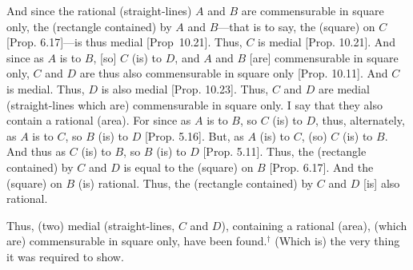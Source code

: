 \begin{Parallel}{}{}
{And since the rational (straight-lines) $A$ and $B$ are commensurable in square only,  the (rectangle contained) by $A$ and $B$---that is to
say, the (square) on $C$ [Prop. 6.17]---is thus medial
[Prop~10.21]. Thus, $C$ is medial
[Prop. 10.21]. And since as $A$ is to $B$, [so]
$C$ (is) to $D$, and $A$ and $B$ [are] commensurable in square only, 
$C$ and $D$ are thus also commensurable in square only [Prop. 10.11]. And $C$ is medial.
Thus, $D$ is also medial [Prop. 10.23]. 
Thus, $C$ and $D$ are medial (straight-lines which are) commensurable
in square only. I say that they also contain a rational (area).
For since as $A$ is to $B$, so $C$ (is) to $D$, thus, alternately,
as $A$ is to $C$, so $B$ (is) to $D$ [Prop. 5.16]. 
But, as $A$ (is) to $C$, (so) $C$ (is) to $B$. 
And thus as $C$ (is) to $B$, so $B$ (is) to $D$ [Prop. 5.11].
 Thus, the (rectangle contained) by $C$ and $D$ is equal to the (square) on $B$ [Prop. 6.17]. And the (square) on $B$ (is) rational. Thus, the (rectangle contained) by $C$ and $D$ [is] also rational.
 
Thus, (two) medial (straight-lines, $C$ and $D$), containing a rational (area), (which are) commensurable in square only, have been found.$^\dag$ (Which is) the very thing it was required to show.}
\end{Parallel}



